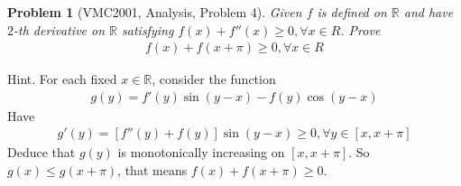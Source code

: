 \documentclass{article}
\newtheorem{problem}{Problem}
\begin{document}
\begin{problem}[VMC2001, Analysis, Problem 4]
	Given $f$ is defined on $\mathbb{R}$ and have $2$-th derivative on $\mathbb{R}$ satisfying $f\left( x \right) + f''\left( x \right) \ge 0,\forall x \in R$. Prove
	\begin{align}
		f\left( x \right) + f\left( {x + \pi } \right) \ge 0,\forall x \in R
	\end{align}
\end{problem}
{\sf Hint.} For each fixed $x \in \mathbb{R}$, consider the function
\begin{align}
	g\left( y \right) = f'\left( y \right)\sin \left( {y - x} \right) - f\left( y \right)\cos \left( {y - x} \right)
\end{align}
Have
\begin{align}
	g'\left( y \right) = \left[ {f''\left( y \right) + f\left( y \right)} \right]\sin \left( {y - x} \right) \ge 0,\forall y \in \left[ {x,x + \pi } \right]
\end{align}
Deduce that $g(y)$ is monotonically increasing on $\left[ {x,x + \pi } \right]$. So $g\left( x \right) \le g\left( {x + \pi } \right)$, that means $f\left( x \right) + f\left( {x + \pi } \right) \ge 0$.
\end{document}
